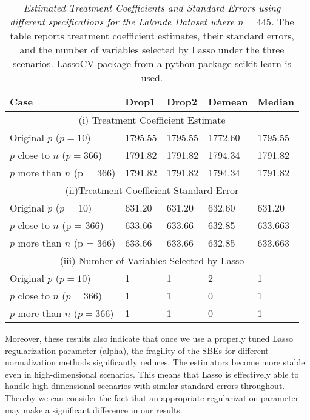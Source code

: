 \begin{table}[h!]
\renewcommand{\arraystretch}{1.5}
\centering
\begin{tabular}{||l l l l l||} 
 \hline
 \hline
 Case & Drop1 & Drop2 & Demean & Median \\ [0.5ex] 
 \hline \hline
 \multicolumn{5}{||c||}{(i) Treatment Coefficient Estimate} \\ [0.5ex]
 Original $p$ ($p = 10$) & 1795.55 & 1795.55 & 1772.60 & 1795.55  \\ 
 $p$ close to $n$ ($p = 366$) & 1791.82 & 1791.82 & 1794.34 & 1791.82 \\
 $p$ more than $n$ (p = 366) & 1791.82 & 1791.82 & 1794.34 & 1791.82  \\
 \hline
 \multicolumn{5}{||c||}{(ii)Treatment Coefficient Standard Error} \\ [0.5ex]
 Original $p$ ($p$ = 10) & 631.20 & 631.20 & 632.60 & 631.20 \\ 
 $p$ close to $n$ (p = 366) & 633.66 & 633.66& 632.85 & 633.663  \\
 $p$ more than $n$ (p = 366) & 633.66 & 633.66& 632.85 & 633.663 \\
 \hline
 \multicolumn{5}{||c||}{(iii) Number of Variables Selected by Lasso} \\ [0.5ex]
 Original $p$ ($p = 10$) & 1 & 1 & 2 & 1 \\ 
 $p$ close to $n$ ($p = 366$) & 1 & 1 & 0 & 1 \\
 $p$ more than $n$ ($p = 366$) & 1 & 1 & 0 & 1 \\
 \hline \hline
\end{tabular}
\caption{\textit{Estimated Treatment Coefficients and Standard Errors using different specifications for the Lalonde Dataset where $n = 445$.} The table reports treatment coefficient estimates, their standard errors, and the number of variables selected by Lasso under the three scenarios. LassoCV package from a python package scikit-learn is used.}
\label{table:1}
\end{table}

Moreover, these results also indicate that once we use a properly tuned Lasso regularization parameter (alpha), the fragility of the SBEs for different normalization methods significantly reduces. The estimators become more stable even in high-dimensional scenarios. This means that Lasso is effectively able to handle high dimensional scenarios with similar standard errors throughout. Thereby we can consider the fact that an appropriate regularization parameter may make a significant difference in our results. 
